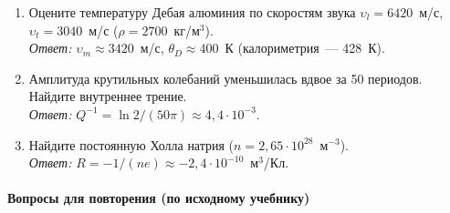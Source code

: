 \begin{enumerate}[label={\sffamily\bfseries\color{fmHead}\arabic*.}]
\item Оцените температуру Дебая алюминия по скоростям звука
$\upsilon_l=6420$~м/с, $\upsilon_t=3040$~м/с ($\rho=2700$~кг/м$^3$).\\
\emph{Ответ:} $\upsilon_m\approx3420$~м/с, $\theta_D\approx400$~К
(калориметрия~— 428~К).
\item Амплитуда крутильных колебаний уменьшилась вдвое за 50 периодов.
Найдите внутреннее трение.\\
\emph{Ответ:} $Q^{-1}=\ln2/(50\pi)\approx4{,}4\cdot10^{-3}$.
\item Найдите постоянную Холла натрия ($n=2{,}65\cdot10^{28}$~м$^{-3}$).\\
\emph{Ответ:} $R=-1/(ne)\approx-2{,}4\cdot10^{-10}$~м$^3$/Кл.
\end{enumerate}

\paragraph{Вопросы для повторения (по исходному учебнику)}
